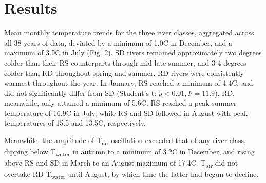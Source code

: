 \documentclass[notitlepage]{article}
\begin{document}
\section*{Results}

Mean monthly temperature trends for the three river classes, aggregated across all 38 years of data, deviated by a minimum of 1.0\degree C in December, and a maximum of 3.9\degree C in July (Fig. 2). SD rivers remained approximately two degrees colder than their RS counterparts through mid-late summer, and 3-4 degrees colder than RD throughout spring and summer. RD rivers were consistently warmest throughout the year. In January, RS reached a minimum of 4.4\degree C, and did not significantly differ from SD (Student's t: $p<0.01, F=11.9$). RD, meanwhile, only attained a minimum of 5.6\degree C. RS reached a peak summer temperature of 16.9\degree C in July, while RS and SD followed in August with peak temperatures of 15.5 and 13.5\degree C, respectively.

Meanwhile, the amplitude of T\textsubscript{air} oscillation exceeded that of any river class, dipping below T\textsubscript{water} in autumn to a minimum of 3.2\degree C in December, and rising above RS and SD in March to an August maximum of 17.4\degree C. T\textsubscript{air} did not overtake RD T\textsubscript{water} until August, by which time the latter had begun to decline.

\begin{center}
\end{center}
\end{document}
